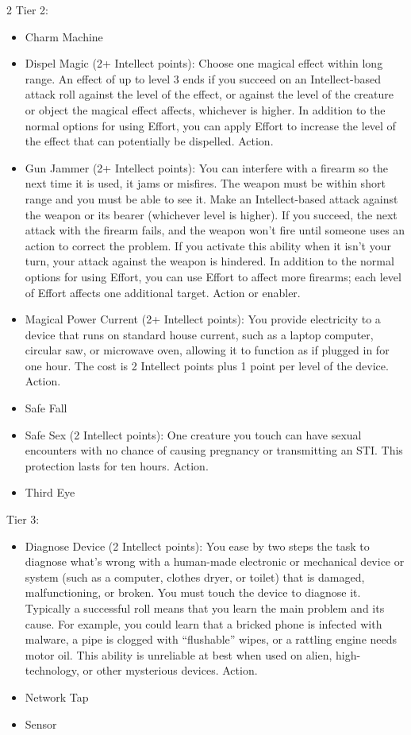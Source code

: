\begin{multicols}{2}
Tier 2:
\begin{itemize}
\item Charm Machine 
\item Dispel Magic (2+ Intellect points): Choose one magical effect within long range. An effect of up to level 3 ends if you succeed on an Intellect-based attack roll against the level of the effect, or against the level of the creature or object the magical effect affects, whichever is higher. In addition to the normal options for using Effort, you can apply Effort to increase the level of the effect that can potentially be dispelled. Action. 
\item Gun Jammer (2+ Intellect points): You can interfere with a firearm so the next time it is used, it jams or misfires. The weapon must be within short range and you must be able to see it. Make an Intellect-based attack against the weapon or its bearer (whichever level is higher). If you succeed, the next attack with the firearm fails, and the weapon won’t fire until someone uses an action to correct the problem. If you activate this ability when it isn’t your turn, your attack against the weapon is hindered. In addition to the normal options for using Effort, you can use Effort to affect more firearms; each level of Effort affects one additional target. Action or enabler. 
\item Magical Power Current (2+ Intellect points): You provide electricity to a device that runs on standard house current, such as a laptop computer, circular saw, or microwave oven, allowing it to function as if plugged in for one hour. The cost is 2 Intellect points plus 1 point per level of the device. Action. 
\item Safe Fall 
\item Safe Sex (2 Intellect points): One creature you touch can have sexual encounters with no chance of causing pregnancy or transmitting an STI. This protection lasts for ten hours. Action.  
\item Third Eye
\end{itemize}

Tier 3:
\begin{itemize}
\item Diagnose Device (2 Intellect points): You ease by two steps the task to diagnose what’s wrong with a human-made electronic or mechanical device or system (such as a computer, clothes dryer, or toilet) that is damaged, malfunctioning, or broken. You must touch the device to diagnose it. Typically a successful roll means that you learn the main problem and its cause. For example, you could learn that a bricked phone is infected with malware, a pipe is clogged with “flushable” wipes, or a rattling engine needs motor oil. This ability is unreliable at best when used on alien, high-technology, or other mysterious devices. Action. 
\item Network Tap 
\item Sensor
\end{itemize}


\end{multicols}
